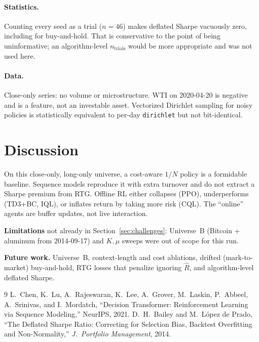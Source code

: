 \documentclass[11pt]{article}
\begin{document}
\paragraph{Statistics.}
Counting every seed as a trial ($n=46$) makes deflated Sharpe vacuously zero, including for buy-and-hold. That is conservative to the point of being uninformative; an algorithm-level $n_{\mathrm{trials}}$ would be more appropriate and was not used here.

\paragraph{Data.}
Close-only series: no volume or microstructure. WTI on 2020-04-20 is negative and is a feature, not an investable asset. Vectorized Dirichlet sampling for noisy policies is statistically equivalent to per-day \texttt{dirichlet} but not bit-identical.

\section{Discussion}
On this close-only, long-only universe, a cost-aware $1/N$ policy is a formidable baseline. Sequence models reproduce it with extra turnover and do not extract a Sharpe premium from RTG. Offline RL either collapses (PPO), underperforms (TD3+BC, IQL), or inflates return by taking more risk (CQL). The ``online'' agents are buffer updates, not live interaction.

\textbf{Limitations} not already in Section~\ref{sec:challenges}: Universe~B (Bitcoin + aluminum from 2014-09-17) and $K,\mu$ sweeps were out of scope for this run.

\textbf{Future work.} Universe~B, context-length and cost ablations, drifted (mark-to-market) buy-and-hold, RTG losses that penalize ignoring $\hat{R}$, and algorithm-level deflated Sharpe.

\begin{thebibliography}{9}
L.~Chen, K.~Lu, A.~Rajeswaran, K.~Lee, A.~Grover, M.~Laskin, P.~Abbeel, A.~Srinivas, and I.~Mordatch, ``Decision Transformer: Reinforcement Learning via Sequence Modeling,'' NeurIPS, 2021.
D.~H.~Bailey and M.~L\'opez de Prado, ``The Deflated Sharpe Ratio: Correcting for Selection Bias, Backtest Overfitting and Non-Normality,'' \emph{J.~Portfolio Management}, 2014.
\end{thebibliography}
\end{document}
